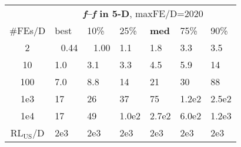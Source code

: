 \begin{tabular}{c|llllll}
 & \multicolumn{6}{|c}{\textbf{\textit{f}\raisebox{-0.35ex}{1}--\textit{f}\raisebox{-0.35ex}{24} in 5-D}, maxFE/D=2020}\\
\#FEs/D & best & 10\% & 25\% & \textbf{med} & 75\% & 90\%\\
2 & ~\,0.44 & ~\,1.00 & \hspace*{1ex}1.1 & \hspace*{1ex}1.8 & \hspace*{1ex}3.3 & \hspace*{1ex}3.5\\
10 & \hspace*{1ex}1.0 & \hspace*{1ex}3.1 & \hspace*{1ex}3.3 & \hspace*{1ex}4.5 & \hspace*{1ex}5.9 & 14\\
100 & \hspace*{1ex}7.0 & \hspace*{1ex}8.8 & 14 & 21 & 30 & 88\\
1e3 & 17 & 26 & 37 & 75 & 1.2e2 & 2.5e2\\
1e4 & 17 & 49 & 1.0e2 & 2.7e2 & 6.0e2 & 1.2e3\\
$\text{RL}_{\text{US}}$/D & 2e3 & 2e3 & 2e3 & 2e3 & 2e3 & 2e3
\end{tabular}
